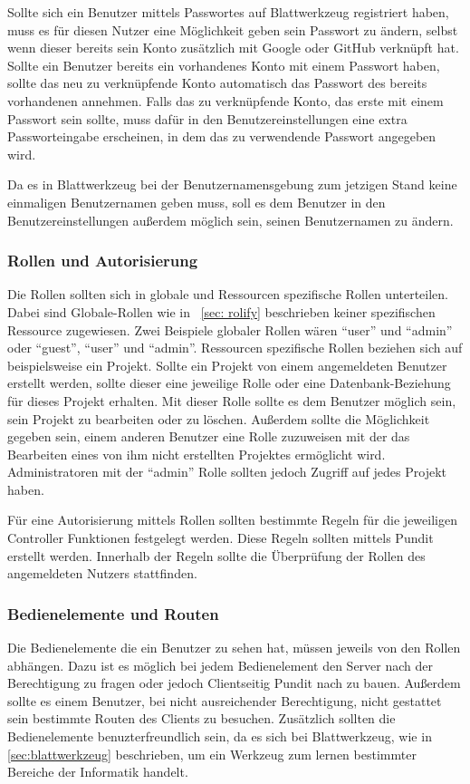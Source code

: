 \documentclass[paper=a4,fontsize=12pt,parskip=half]{scrartcl}
\begin{document}
	Sollte sich ein Benutzer mittels Passwortes auf Blattwerkzeug registriert haben, muss es für diesen Nutzer eine Möglichkeit geben sein Passwort zu ändern, selbst wenn dieser bereits sein Konto zusätzlich mit Google oder GitHub verknüpft hat. Sollte ein Benutzer bereits ein vorhandenes Konto mit einem Passwort haben, sollte das neu zu verknüpfende Konto automatisch das Passwort des bereits vorhandenen annehmen. Falls das zu verknüpfende Konto, das erste mit einem Passwort sein sollte, muss dafür in den Benutzereinstellungen eine extra Passworteingabe erscheinen, in dem das zu verwendende Passwort angegeben wird.
	
	Da es in Blattwerkzeug bei der Benutzernamensgebung zum jetzigen Stand keine einmaligen Benutzernamen geben muss, soll es dem Benutzer in den Benutzereinstellungen außerdem möglich sein, seinen Benutzernamen zu ändern. 
	
	\subsubsection{Rollen und Autorisierung}
	Die Rollen sollten sich in globale und Ressourcen spezifische Rollen unterteilen. Dabei sind Globale-Rollen wie in ~\ref{sec: rolify} beschrieben keiner spezifischen Ressource zugewiesen. Zwei Beispiele globaler Rollen wären \enquote{user} und \enquote{admin} oder \enquote{guest}, \enquote{user} und \enquote{admin}. Ressourcen spezifische Rollen beziehen sich auf beispielsweise ein Projekt. Sollte ein Projekt von einem angemeldeten Benutzer erstellt werden, sollte dieser eine jeweilige Rolle oder eine Datenbank-Beziehung für dieses Projekt erhalten. Mit dieser Rolle sollte es dem Benutzer möglich sein, sein Projekt zu bearbeiten oder zu löschen. Außerdem sollte die Möglichkeit gegeben sein, einem anderen Benutzer eine Rolle zuzuweisen mit der das Bearbeiten eines von ihm nicht erstellten Projektes ermöglicht wird. Administratoren mit der \enquote{admin} Rolle sollten jedoch Zugriff auf jedes Projekt haben.

	Für eine Autorisierung mittels Rollen sollten bestimmte Regeln für die jeweiligen Controller Funktionen festgelegt werden. Diese Regeln sollten mittels Pundit erstellt werden. Innerhalb der Regeln sollte die Überprüfung der Rollen des angemeldeten Nutzers stattfinden. 
	
	\subsubsection{Bedienelemente und Routen}
	Die Bedienelemente die ein Benutzer zu sehen hat, müssen jeweils von den Rollen abhängen. Dazu ist es möglich bei jedem Bedienelement den Server nach der Berechtigung zu fragen oder jedoch Clientseitig Pundit nach zu bauen. Außerdem sollte es einem Benutzer, bei nicht ausreichender Berechtigung, nicht gestattet sein bestimmte Routen des Clients zu besuchen. Zusätzlich sollten die Bedienelemente benuzterfreundlich sein, da es sich bei Blattwerkzeug, wie in \ref{sec:blattwerkzeug} beschrieben, um ein Werkzeug zum lernen bestimmter Bereiche der Informatik handelt.
	
\end{document}
